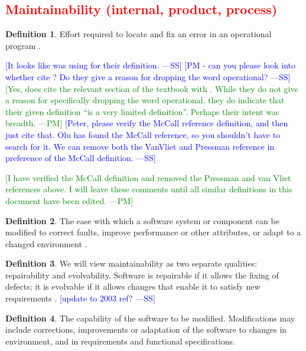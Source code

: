 \documentclass[letterpaper, cleveref]{lipics-v2019}
\newcommand{\authornote}[3]{\textcolor{#1}{[#3 ---#2]}}
\newcommand{\authornote}[3]{}
\newcommand{\wss}[1]{\authornote{blue}{SS}{#1}} %
\newcommand{\pmi}[1]{\authornote{green}{PM}{#1}} %
\newcommand{\notdone}[1]{\textcolor{red}{#1}}
\theoremstyle{definition}
\newtheorem{defn}{Definition}
\begin{document}
\subsection{\notdone{Maintainability (internal, product, process)}} %

\begin{defn}
  Effort required to locate and fix an error in an operational program
  \citep{McCallEtAl1977}.

  \wss{It looks like \citet{pressman2005software} was using
  \citet{McCallEtAl1977} for their definition.} \wss{PM - can you please
  look into whether \citet{pressman2005software} cite
  \citet{McCallEtAl1977}?  Do they give a reason for dropping the word
  operational?}  \pmi{Yes, \citet{pressman2005software} does cite the
  relevant section of the textbook with \citet{McCallEtAl1977}. While they
  do not give a reason for specifically dropping the word operational, they
  do indicate that their given definition ``is a very limited definition''.
  Perhaps their intent was breadth.} \wss{Peter, please verify the McCall
  reference definition, and then just cite that.  Olu has found the McCall
  reference, so you shouldn't have to search for it.  We can remove both the
  VanVliet and Pressman reference in preference of the McCall definition.}

  \pmi{I have verified the McCall definition and removed the Pressman and
  van Vliet references above. I will leave these comments until all similar
  definitions in this document have been edited.}
\end{defn}

\begin{defn} \label{MaintainabilityDefnSelected1} 
  The ease with which a software system or component can be modified to correct
  faults, improve performance or other attributes, or adapt to a changed
  environment \citep{IEEEStdGlossarySET1990}.
\end{defn}

\begin{defn}
  We will view maintainability as two separate qualities: repairability and
  evolvability. Software is repairable if it allows the fixing of defects;
  it is evolvable if it allows changes that enable it to satisfy new
  requirements \citep{ghezzi1991fundamentals}. \wss{update to 2003 ref?}
\end{defn}

\begin{defn}
  The capability of the software to be modified.  Modifications may include
  corrections, improvements or adaptation of the software to changes in
  environment, and in requirements and functional specifications.
  \cite{ISO9126} %
\end{defn}
\end{document}
